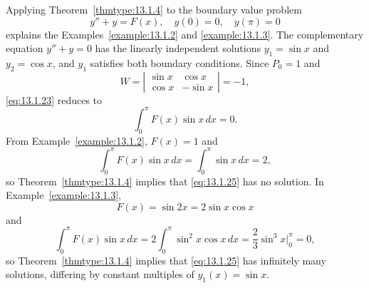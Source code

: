 \begin{example}
  \label{example:13.1.7} \rm Applying Theorem~\ref{thmtype:13.1.4} to the boundary value problem
  \begin{equation}
    \label{eq:13.1.25}y''+y=F(x),\quad y(0)=0,\quad y(\pi)=0
  \end{equation}
  explains the Examples~\ref{example:13.1.2} and \ref{example:13.1.3}. The complementary equation
  $y''+y=0$ has the linearly independent solutions $y_{1}=\sin x$ and $y_{2}=\cos x$, and $y_{1}$
  satisfies both boundary conditions. Since $P_{0}=1$ and
  \[
    W= \left|
    \begin{array}{crccccc}
      \sin x & \cos x  \\
      \cos x & -\sin x
    \end{array}\right|=-1,
  \]
  \eqref{eq:13.1.23} reduces to
  \[
    \int_{0}^{\pi}F(x)\sin x\,dx=0.
  \]
  From Example~\ref{example:13.1.2}, $F(x)=1$ and
  \[
    \int_{0}^{\pi}F(x)\sin x\,dx=\int_{0}^{\pi}\sin x\,dx=2,
  \]
  so Theorem~\ref{thmtype:13.1.4} implies that \eqref{eq:13.1.25} has no solution. In
  Example~\ref{example:13.1.3},
  \[
    F(x)=\sin2x=2\sin x\cos x
  \]
  and
  \[
    \int_{0}^{\pi}F(x)\sin x\,dx=2\int_{0}^{\pi}\sin^{2}x\cos x\,dx =\frac{2}{3}\sin^{3}x\bigg|_{0}^{\pi}=0,
  \]
  so Theorem~\ref{thmtype:13.1.4} implies that \eqref{eq:13.1.25} has infinitely many solutions,
  differing by constant multiples of $y_{1}(x)=\sin x$.
\end{example}

\exercises

